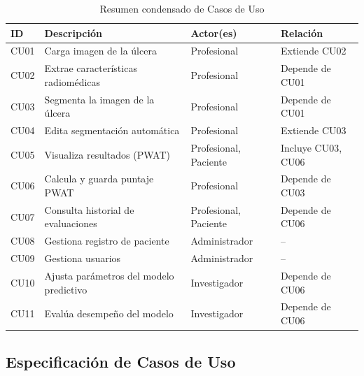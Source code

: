 \begin{table}[H]
  \small
  \centering
  \caption{Resumen condensado de Casos de Uso}
  \label{tab:cu_resumido}
  \begin{tabular}{p{1cm} p{6cm} p{2cm} p{4cm}}
    \toprule
    \textbf{ID} & \textbf{Descripción}                          & \textbf{Actor(es)}           & \textbf{Relación}           \\
    \midrule
    CU01        & Carga imagen de la úlcera                     & Profesional                  & Extiende CU02               \\
    CU02        & Extrae características radiomédicas           & Profesional                  & Depende de CU01             \\
    CU03        & Segmenta la imagen de la úlcera               & Profesional                  & Depende de CU01             \\
    CU04        & Edita segmentación automática                 & Profesional                  & Extiende CU03               \\
    CU05        & Visualiza resultados (PWAT)                   & Profesional, Paciente        & Incluye CU03, CU06          \\
    CU06        & Calcula y guarda puntaje PWAT                 & Profesional                  & Depende de CU03             \\
    CU07        & Consulta historial de evaluaciones            & Profesional, Paciente        & Depende de CU06             \\
    CU08        & Gestiona registro de paciente                 & Administrador                & –                           \\
    CU09        & Gestiona usuarios                             & Administrador                & –                           \\
    CU10        & Ajusta parámetros del modelo predictivo       & Investigador                 & Depende de CU06             \\
    CU11        & Evalúa desempeño del modelo                   & Investigador                 & Depende de CU06             \\
    \bottomrule
  \end{tabular}
\end{table}



\subsection{Especificación de Casos de Uso}
\label{ssc:CUEspec}

